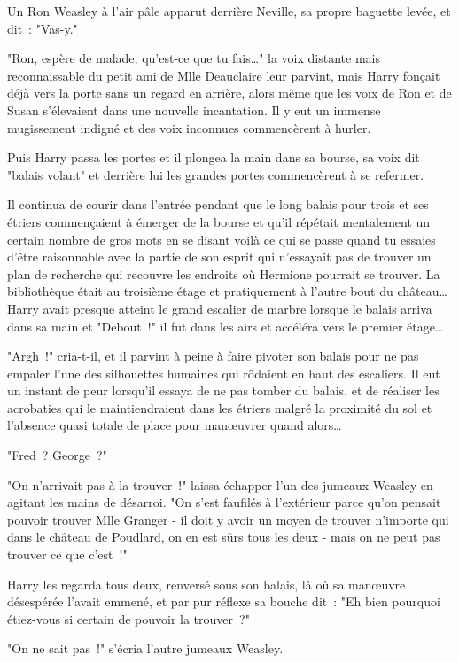 Un Ron Weasley à l'air pâle apparut derrière Neville, sa propre baguette levée, et dit~: "Vas-y."

"Ron, espère de malade, qu'est-ce que tu fais…" la voix distante mais reconnaissable du petit ami de Mlle Deauclaire leur parvint, mais Harry fonçait déjà vers la porte sans un regard en arrière, alors même que les voix de Ron et de Susan s'élevaient dans une nouvelle incantation. Il y eut un immense mugissement indigné et des voix inconnues commencèrent à hurler.

Puis Harry passa les portes et il plongea la main dans sa bourse, sa voix dit "balais volant" et derrière lui les grandes portes commencèrent à se refermer.

Il continua de courir dans l'entrée pendant que le long balais pour trois et ses étriers commençaient à émerger de la bourse et qu'il répétait mentalement un certain nombre de gros mots en se disant voilà ce qui se passe quand tu essaies d'être raisonnable avec la partie de son esprit qui n'essayait pas de trouver un plan de recherche qui recouvre les endroits où Hermione pourrait se trouver. La bibliothèque était au troisième étage et pratiquement à l'autre bout du château… Harry avait presque atteint le grand escalier de marbre lorsque le balais arriva dans sa main et "Debout~!" il fut dans les airs et accéléra vers le premier étage…

"Argh~!" cria-t-il, et il parvint à peine à faire pivoter son balais pour ne pas empaler l'une des silhouettes humaines qui rôdaient en haut des escaliers. Il eut un instant de peur lorsqu'il essaya de ne pas tomber du balais, et de réaliser les acrobaties qui le maintiendraient dans les étriers malgré la proximité du sol et l'absence quasi totale de place pour manœuvrer quand alors…

"Fred~? George~?"

"On n'arrivait pas à la trouver~!" laissa échapper l'un des jumeaux Weasley en agitant les mains de désarroi. "On s'est faufilés à l'extérieur parce qu'on pensait pouvoir trouver Mlle Granger - il doit y avoir un moyen de trouver n'importe qui dans le château de Poudlard, on en est sûrs tous les deux - mais on ne peut pas trouver ce que c'est~!"

Harry les regarda tous deux, renversé sous son balais, là où sa manœuvre désespérée l'avait emmené, et par pur réflexe sa bouche dit~: "Eh bien pourquoi étiez-vous si certain de pouvoir la trouver~?"

"On ne sait pas~!" s'écria l'autre jumeaux Weasley.

